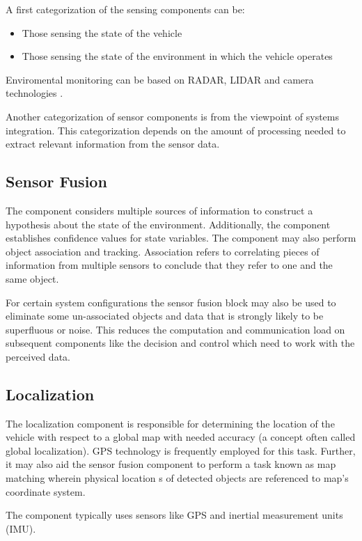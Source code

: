 A first categorization of the sensing components can be: \cite{Bahere, Serban}
\begin{itemize}
\item Those sensing the state of the vehicle 
\item Those sensing the state of the environment in which the vehicle operates
\end{itemize}

Enviromental monitoring can be based on RADAR, LIDAR and camera technologies \cite{Serban}. 

Another categorization of sensor components is from the viewpoint of systems integration. 
This categorization depends on the amount of processing needed to extract relevant information from the sensor data.

\subsection{Sensor Fusion}

The component considers multiple sources of information to construct a hypothesis about the state of the environment. 
Additionally, the component establishes confidence values for state variables. 
The component may also perform object association and tracking. Association refers to correlating pieces of
information from multiple sensors to conclude that they refer to one and the same object.

For certain system configurations the sensor fusion block may also be used to eliminate some un-associated objects and data that 
is strongly likely to be superfluous or noise. This reduces the computation and communication load on 
subsequent components like the decision and control which need to work with the perceived data.


\subsection{Localization}

The localization component is responsible for determining the location of the vehicle with respect to a global map with needed accuracy (a concept often called global localization).
GPS technology is frequently employed for this task.
Further, it may also aid the sensor fusion component to perform a task known as map matching wherein physical location s of detected objects are referenced to map’s coordinate system. 

The component typically uses sensors like GPS and inertial measurement units (IMU).

